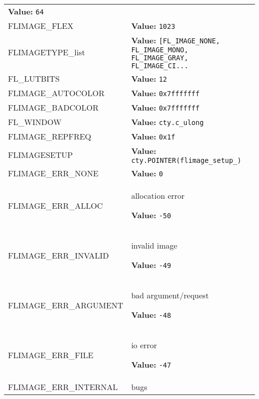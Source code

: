 \begin{longtable}{|p{\varnamewidth}|p{\vardescrwidth}|l}
\textbf{Value:} 
{\tt 64}&\\
\cline{1-2}
\raggedright F\-L\-I\-M\-A\-G\-E\-\_\-F\-L\-E\-X\- & \raggedright \textbf{Value:} 
{\tt 1023}&\\
\cline{1-2}
\raggedright F\-L\-I\-M\-A\-G\-E\-T\-Y\-P\-E\-\_\-l\-i\-s\-t\- & \raggedright \textbf{Value:} 
{\tt [FL\_IMAGE\_NONE, FL\_IMAGE\_MONO, FL\_IMAGE\_GRAY, FL\_IMAGE\_CI\texttt{...}}&\\
\cline{1-2}
\raggedright F\-L\-\_\-L\-U\-T\-B\-I\-T\-S\- & \raggedright \textbf{Value:} 
{\tt 12}&\\
\cline{1-2}
\raggedright F\-L\-I\-M\-A\-G\-E\-\_\-A\-U\-T\-O\-C\-O\-L\-O\-R\- & \raggedright \textbf{Value:} 
{\tt 0x7fffffff}&\\
\cline{1-2}
\raggedright F\-L\-I\-M\-A\-G\-E\-\_\-B\-A\-D\-C\-O\-L\-O\-R\- & \raggedright \textbf{Value:} 
{\tt 0x7fffffff}&\\
\cline{1-2}
\raggedright F\-L\-\_\-W\-I\-N\-D\-O\-W\- & \raggedright \textbf{Value:} 
{\tt cty.c\_ulong}&\\
\cline{1-2}
\raggedright F\-L\-I\-M\-A\-G\-E\-\_\-R\-E\-P\-F\-R\-E\-Q\- & \raggedright \textbf{Value:} 
{\tt 0x1f}&\\
\cline{1-2}
\raggedright F\-L\-I\-M\-A\-G\-E\-S\-E\-T\-U\-P\- & \raggedright \textbf{Value:} 
{\tt cty.POINTER(flimage\_setup\_)}&\\
\cline{1-2}
\raggedright F\-L\-I\-M\-A\-G\-E\-\_\-E\-R\-R\-\_\-N\-O\-N\-E\- & \raggedright \textbf{Value:} 
{\tt 0}&\\
\cline{1-2}
\raggedright F\-L\-I\-M\-A\-G\-E\-\_\-E\-R\-R\-\_\-A\-L\-L\-O\-C\- & \raggedright allocation error

\textbf{Value:} 
{\tt -50}&\\
\cline{1-2}
\raggedright F\-L\-I\-M\-A\-G\-E\-\_\-E\-R\-R\-\_\-I\-N\-V\-A\-L\-I\-D\- & \raggedright invalid image

\textbf{Value:} 
{\tt -49}&\\
\cline{1-2}
\raggedright F\-L\-I\-M\-A\-G\-E\-\_\-E\-R\-R\-\_\-A\-R\-G\-U\-M\-E\-N\-T\- & \raggedright bad argument/request

\textbf{Value:} 
{\tt -48}&\\
\cline{1-2}
\raggedright F\-L\-I\-M\-A\-G\-E\-\_\-E\-R\-R\-\_\-F\-I\-L\-E\- & \raggedright io error

\textbf{Value:} 
{\tt -47}&\\
\cline{1-2}
\raggedright F\-L\-I\-M\-A\-G\-E\-\_\-E\-R\-R\-\_\-I\-N\-T\-E\-R\-N\-A\-L\- & \raggedright bugs


\end{longtable}
